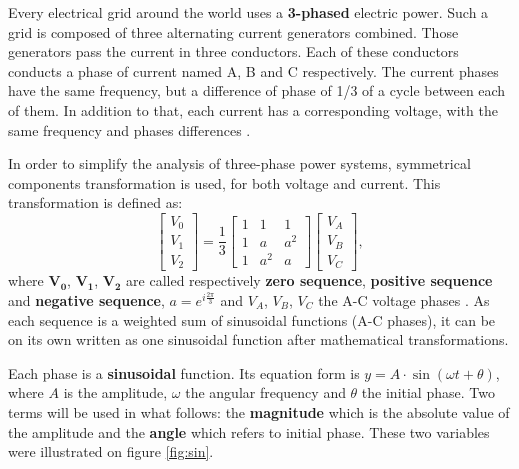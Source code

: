 Every electrical grid around the world uses a \textbf{3-phased} electric power. Such a grid is composed of three alternating current generators combined. Those generators pass the current in three conductors. Each of these conductors conducts a phase of current named A, B and C respectively. The current phases have the same frequency, but a difference of phase of 1/3 of a cycle between each of them. In addition to that, each current has a corresponding voltage, with the same frequency and phases differences \cite{noauthor_three-phase_2020}.

In order to simplify the analysis of three-phase power systems, symmetrical components transformation is used, for both voltage and current. This transformation is defined as:
\begin{equation}
     \begin{bmatrix}
        V_0 \\ V_1 \\ V_2 
    \end{bmatrix} = \frac 1 3 \begin{bmatrix}
        1 & 1& 1 \\
        1 & a & a^2 \\
        1 & a^2 & a
    \end{bmatrix}
    \begin{bmatrix}
        V_A \\ V_B \\ V_C
    \end{bmatrix},
\end{equation}
where $\mathbf{V_0}$, $\mathbf{V_1}$, $\mathbf{V_2}$ are called respectively \textbf{zero sequence}, \textbf{positive sequence} and \textbf{negative sequence}, $a = e^{i \frac{2\pi}{3}}$ and $V_A$, $V_B$, $V_C$ the A-C voltage phases \cite{jl_kirtley_jr_introduction_nodate}. As each sequence is a weighted sum of sinusoidal functions (A-C phases), it can be on its own written as one sinusoidal function after mathematical transformations.

Each phase is a \textbf{sinusoidal} function. Its equation form is $y = A \cdot \sin(\omega t + \theta)$, where $A$ is the amplitude, $\omega$ the angular frequency and $\theta$ the initial phase. Two terms will be used in what follows: the \textbf{magnitude} which is the absolute value of the amplitude and the \textbf{angle} which refers to initial phase. These two variables were illustrated on figure \ref{fig:sin}.

